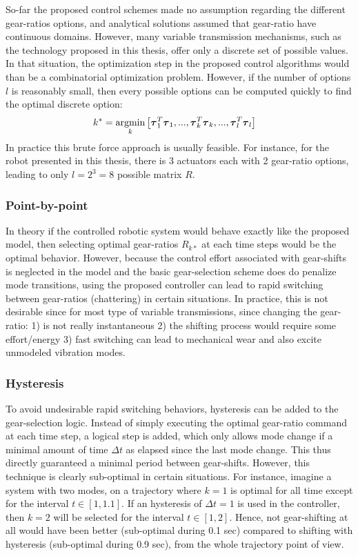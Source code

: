 So-far the proposed control schemes made no assumption regarding the different gear-ratios options, and analytical solutions assumed that gear-ratio have continuous domains. However, many variable transmission mechanisms, such as the technology proposed in this thesis, offer only a discrete set of possible values. In that situation, the optimization step in the proposed control algorithms would than be a combinatorial optimization problem. However, if the number of options $l$ is reasonably small, then every possible options can be computed quickly to find the optimal discrete option:
%
\begin{align}
k^{*} &= \operatornamewithlimits{argmin}\limits_{k} \left[  \vec{\tau}_1^T\vec{\tau}_1  , ... , \vec{\tau}_k^T\vec{\tau}_k , ...  , \vec{\tau}_l^T\vec{\tau}_l \right]
\end{align}
%
In practice this brute force approach is usually feasible. For instance, for the robot presented in this thesis, there is 3 actuators each with 2 gear-ratio options, leading to only $l=2^3=8$ possible matrix $R$.

\subsubsection{Point-by-point}

In theory if the controlled robotic system would behave exactly like the proposed model, then selecting optimal gear-ratios $R_{k*}$ at each time steps would be the optimal behavior. However, because the control effort associated with gear-shifts is neglected in the model and the basic gear-selection scheme does do penalize mode transitions, using the proposed controller can lead to rapid switching between gear-ratios (chattering) in certain situations. In practice, this is not desirable since for most type of variable transmissions, since changing the gear-ratio: 1) is not really instantaneous 2) the shifting process would require some effort/energy 3) fast switching can lead to mechanical wear and also excite unmodeled vibration modes. 

\subsubsection{Hysteresis}

To avoid undesirable rapid switching behaviors, hysteresis can be added to the gear-selection logic. Instead of simply executing the optimal gear-ratio command at each time step, a logical step is added, which only allows mode change if a minimal amount of time $\Delta t$ as elapsed since the last mode change. This thus directly guaranteed a minimal period between gear-shifts. However, this technique is clearly sub-optimal in certain situations. For instance, imagine a system with two modes, on a trajectory where $k=1$ is optimal for all time except for the interval $t\in[1,1.1]$. If an hysteresis of $\Delta t = 1$ is used in the controller, then $k=2$ will be selected for the interval $t\in[1,2]$. Hence, not gear-shifting at all would have been better (sub-optimal during 0.1 sec) compared to shifting with hysteresis (sub-optimal during 0.9 sec), from the whole trajectory point of view. 

